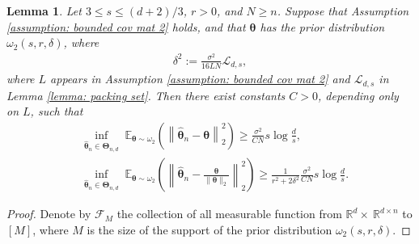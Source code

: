 \documentclass[aos,preprint]{imsart}
\theoremstyle{plain}
\newtheorem{lemma}[theorem]{Lemma}
\theoremstyle{definition}
\newtheorem{remark}{Remark}
\newcommand{\btheta}{\boldsymbol{\theta}}
\newcommand{\bd}[1]{\boldsymbol{#1}}
\newcommand{\hbtheta}{\widehat{\boldsymbol{\theta}}}
\newcommand{\bR}{\mathbb{R}}
\newcommand{\cF}{\mathcal{F}}
\newcommand{\Exp}{\mathbb{E}}
\begin{document}
\begin{appendix}
\begin{lemma}\label{lemma: k unknown}
Let $3 \leq s \leq (d+2)/3$, $r > 0$, and $N \geq n$. Suppose that Assumption \ref{assumption: bounded cov mat 2} holds, and that $\btheta$ has the prior distribution $\omega_2(s,r,\delta)$, where
\begin{align}\label{def:w2_delta}
    \delta^2 := \frac{\sigma^2}{16LN} \mathcal{L}_{d,s},
\end{align}
where $L$ appears in Assumption \ref{assumption: bounded cov mat 2} and $\mathcal{L}_{d,s}$ in Lemma \ref{lemma: packing set}.  Then there exist  constants $C > 0$, depending only on $L$, such that
\begin{align*}
    &\inf_{\hbtheta_n \in \bd{\Theta}_{n,d}}\; \Exp_{\btheta\sim \omega_2} \left(\left\|\hbtheta_n-\btheta \right\|_2^2\right) \ge \frac{\sigma^2}{CN} s\log \frac{d}{s}, \\
  &\inf_{\hbtheta_n\in \bd{\Theta}_{n,d}}\; \Exp_{\btheta\sim \omega_2} \left(\left\|\hbtheta_n-\frac{\btheta}{\|\btheta\|_2} \right\|_2^2 \right)  \ge \frac{1}{r^2 + 2\delta^2} \frac{\sigma^2}{CN} s\log \frac{d}{s}.  
\end{align*}
\end{lemma}

\begin{proof} Denote by $\cF_{M}$ the collection of all measurable function from $\bR^{d}\times\ \bR^{d\times n}$ to $[M]$, where $M$ is the size of the support of the prior distribution  $\omega_2(s,r,\delta)$.


\end{proof}
\end{appendix}
\end{document}
